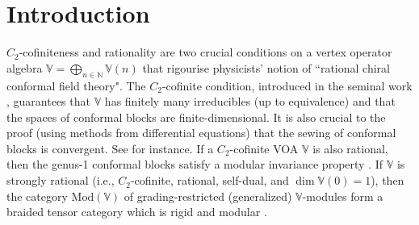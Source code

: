 \documentclass[11pt,b5paper,notitlepage]{article}
\theoremstyle{definition}
\theoremstyle{plain}
\newcommand{\Vbb}{\mathbb V}
\newcommand{\Nbb}{\mathbb N}
\newcommand{\<}{\left\langle}
\renewcommand{\>}{\right\rangle}
\newcommand{\Mod}{\mathrm{Mod}}
\numberwithin{equation}{subsection}
\begin{document}
\tableofcontents




	
	
	
	

	
	

	
	
	
	
	
	
	
	
	

	




\section{Introduction}


\nocite{HLZ1,HLZ2,HLZ3,HLZ4,HLZ5,HLZ6,HLZ7,HLZ8}


$C_2$-cofiniteness and rationality are two crucial conditions on a vertex operator algebra $\Vbb=\bigoplus_{n\in\Nbb}\Vbb(n)$ that rigourise physicists' notion of ``rational chiral conformal field theory". The $C_2$-cofinite condition, introduced in the seminal work \cite{Zhu-modular-invariance}, guarantees that $\Vbb$ has finitely many irreducibles (up to equivalence) and that the spaces of conformal blocks are finite-dimensional. It is also crucial to the proof (using methods from differential equations) that the sewing of conformal blocks is convergent. See \cite{Zhu-modular-invariance,AN03-finite-dimensional,Miy-modular-invariance,Hua-differential-genus-0,Hua-differential-genus-1,NT-P1_conformal_blocks,Fio-genus-1,DGT2,Gui-sewingconvergence} for instance. If a $C_2$-cofinite VOA $\Vbb$ is also rational, then the genus-1 conformal blocks satisfy a modular invariance property \cite{Zhu-modular-invariance,DLM-modular-invariance,Hua-differential-genus-1}. If $\Vbb$ is strongly rational (i.e., $C_2$-cofinite, rational, self-dual, and $\dim\Vbb(0)=1$), then the category $\Mod(\Vbb)$ of grading-restricted (generalized) $\Vbb$-modules form a braided tensor category \cite{HL-tensor-1,HL-tensor-2,HL-tensor-3,Hua-tensor-4,Hua-differential-genus-0,NT-P1_conformal_blocks} which is rigid and modular \cite{Hua-rigidity-modularity}. 
\end{document}
